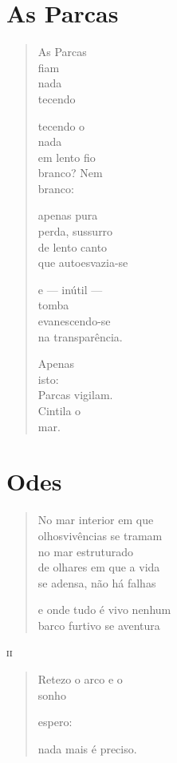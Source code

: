 \chapter{As Parcas}

\begin{verse}
As Parcas\\
fiam\\
nada\\
tecendo

tecendo o\\
\qquad\quad nada\\
em lento fio\\
branco? Nem\\
branco:

apenas pura\\
perda, sussurro\\
de lento canto\\
que autoesvazia-se

e --- inútil ---\\
\qquad tomba\\
evanescendo-se\\
na transparência.

\dotfill

Apenas\\
isto:\\
Parcas vigilam.\\
Cintila o\\
mar.
\end{verse}

\chapter{Odes}


\begin{verse}
No mar interior em que\\
olhosvivências se tramam\\
no mar estruturado\\
de olhares em que a vida\\
se adensa, não há falhas

e onde tudo é vivo nenhum\\
barco furtivo se aventura
\end{verse}

\medskip
\textsc{ii}

\begin{verse}
Retezo o arco e o\\
\qquad\qquad\qquad sonho

espero:

nada mais é preciso.
\end{verse}

